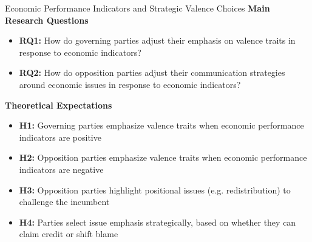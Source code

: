 \documentclass[9pt, aspectratio=169]{beamer}
\begin{document}
\begin{frame}{Economic Performance Indicators and Strategic Valence Choices}
    \textbf{Main Research Questions} \vspace{0.1cm}
    \begin{itemize}
        \item \textbf{RQ1:} How do governing parties adjust their emphasis on valence traits in response to economic indicators?\vspace{0.1cm}
        \item \textbf{RQ2:} How do opposition parties adjust their communication strategies around economic issues in response to economic indicators?
    \end{itemize}
    \vspace{0.4cm}
    \textbf{Theoretical Expectations}\vspace{0.1cm}
\begin{itemize}
    \item \textbf{H1:} Governing parties emphasize valence traits when economic performance indicators are positive\vspace{0.1cm}
    \item \textbf{H2:} Opposition parties emphasize valence traits when economic performance indicators are negative\vspace{0.1cm}
    \item \textbf{H3:} Opposition parties highlight positional issues (e.g. redistribution) to challenge the incumbent\vspace{0.1cm}
    \item \textbf{H4:} Parties select issue emphasis strategically, based on whether they can claim credit or shift blame
\end{itemize}   
    \end{frame}
\end{document}
